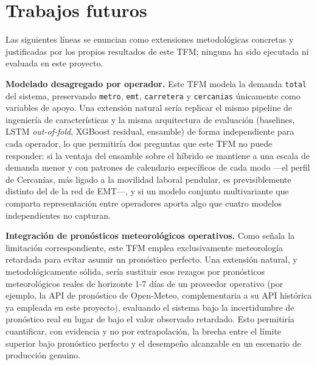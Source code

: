 \section{Trabajos futuros}\label{sec:trabajos_futuros}

Las siguientes líneas se enuncian como extensiones metodológicas concretas y
justificadas por los propios resultados de este TFM; ninguna ha sido ejecutada ni
evaluada en este proyecto.

\textbf{Modelado desagregado por operador.} Este TFM modela la demanda \texttt{total}
del sistema, preservando \texttt{metro}, \texttt{emt}, \texttt{carretera} y
\texttt{cercanias} únicamente como variables de apoyo. Una extensión natural sería
replicar el mismo pipeline de ingeniería de características y la misma arquitectura de
evaluación (baselines, LSTM \emph{out-of-fold}, XGBoost residual, ensamble) de forma
independiente para cada operador, lo que permitiría dos preguntas que este TFM no puede
responder: si la ventaja del ensamble sobre el híbrido se mantiene a una escala de
demanda menor y con patrones de calendario específicos de cada modo —el perfil de
Cercanías, más ligado a la movilidad laboral pendular, es previsiblemente distinto del de
la red de EMT—, y si un modelo conjunto multivariante que comparta representación entre
operadores aporta algo que cuatro modelos independientes no capturan.

\textbf{Integración de pronósticos meteorológicos operativos.} Como señala la limitación
correspondiente, este TFM emplea exclusivamente meteorología retardada para evitar
asumir un pronóstico perfecto. Una extensión natural, y metodológicamente sólida, sería
sustituir esos rezagos por pronósticos meteorológicos reales de horizonte 1-7 días de un
proveedor operativo (por ejemplo, la API de pronóstico de Open-Meteo, complementaria a su
API histórica ya empleada en este proyecto), evaluando el sistema bajo la incertidumbre
de pronóstico real en lugar de bajo el valor observado retardado. Esto permitiría
cuantificar, con evidencia y no por extrapolación, la brecha entre el límite superior
bajo pronóstico perfecto y el desempeño alcanzable en un escenario de producción
genuino.

